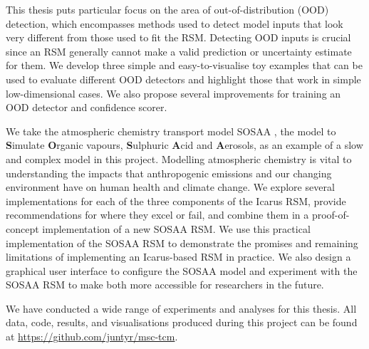This thesis puts particular focus on the area of out-of-distribution (OOD) detection, which encompasses methods used to detect model inputs that look very different from those used to fit the RSM. Detecting OOD inputs is crucial since an RSM generally cannot make a valid prediction or uncertainty estimate for them. We develop three simple and easy-to-visualise toy examples that can be used to evaluate different OOD detectors and highlight those that work in simple low-dimensional cases. We also propose several improvements for training an OOD detector and confidence scorer.

\newpar We take the atmospheric chemistry transport model SOSAA \cite{sosa-description-2011}, the model to \textbf{S}imulate \textbf{O}rganic vapours, \textbf{S}ulphuric \textbf{A}cid and \textbf{A}erosols, as an example of a slow and complex model in this project. Modelling atmospheric chemistry is vital to understanding the impacts that anthropogenic emissions and our changing environment have on human health and climate change. We explore several implementations for each of the three components of the Icarus RSM, provide recommendations for where they excel or fail, and combine them in a proof-of-concept implementation of a new SOSAA RSM. We use this practical implementation of the SOSAA RSM to demonstrate the promises and remaining limitations of implementing an Icarus-based RSM in practice. We also design a graphical user interface to configure the SOSAA model and experiment with the SOSAA RSM to make both more accessible for researchers in the future.

\newpar We have conducted a wide range of experiments and analyses for this thesis. All data, code, results, and visualisations produced during this project can be found at \href{https://github.com/juntyr/msc-tcm}{https://github.com/juntyr/msc-tcm}.

\newpage

